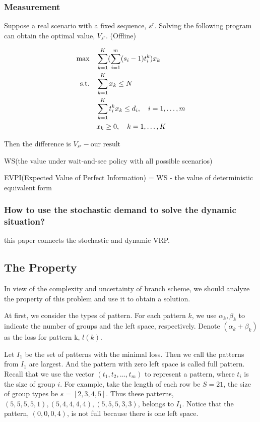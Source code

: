 \subsubsection{Measurement}

Suppose a real scenario with a fixed sequence, $s^{r}$. Solving the following program can obtain the optimal value, $V_{s^{r}}$. (Offline)

\begin{equation*}
\begin{aligned}
  \mbox{max}\quad & \sum_{k=1}^K(\sum_{i=1}^m (s_i-1)t_i^k) x_{k} \\
  \mbox{s.t.} \quad & \sum_{k=1}^K x_{k} \leq N \\
  & \sum_{k=1}^K t_i^k x_k \leq d_i,\quad i=1,\ldots,m \\
  & x_{k} \geq 0, \quad k = 1,\ldots,K \notag
\end{aligned}
\end{equation*}

Then the difference is $V_{s^{r}} - \text{our result}$

WS(the value under wait-and-see policy with all possible scenarios)

EVPI(Expected Value of Perfect Information) = WS - the value of deterministic equivalent form


\subsubsection{How to use the stochastic demand to solve the dynamic situation?}

\cite{bent2004scenario} this paper connects the stochastic and dynamic VRP.


\subsection{The Property}
In view of the complexity and uncertainty of branch scheme, we should analyze the property of this problem and use it to obtain a solution.

At first, we consider the types of pattern. For each pattern $k$, we use $\alpha_k, \beta_k$ to indicate the number of groups and the left space, respectively. Denote $(\alpha_k + \beta_k)$ as the loss for pattern k, $l(k)$.


Let $I_1$ be the set of patterns with the minimal loss. Then we call the patterns from $I_1$ are largest. And the pattern with zero left space is called full pattern.
Recall that we use the vector $(t_1,t_2,\ldots,t_m)$ to represent a pattern, where $t_i$ is the size of group $i$. For example, take the length of each row be $S = 21$, the size of group types be $s = [2,3,4,5]$. Thus these patterns, $(5,5,5,5,1),(5,4,4,4,4),(5,5,5,3,3)$, belongs to $I_1$. Notice that the pattern, $(0,0,0,4)$, is not full because there is one left space.


